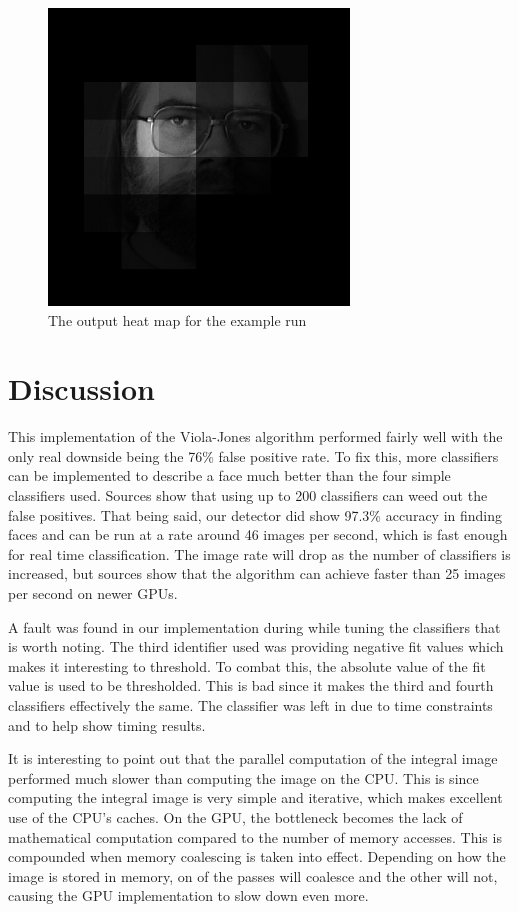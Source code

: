 \documentclass[12pt] {article}
\begin{document}
\begin{figure}[h!]
	\centering
		\includegraphics[width=80mm]{heatmap.png}
		\caption{The output heat map for the example run}
\end{figure}


\section{Discussion}
This implementation of the Viola-Jones algorithm performed fairly well with the only real downside being the 76\% false positive rate. To fix this, more classifiers can be implemented to describe a face much better than the four simple classifiers used. Sources show that using up to 200 classifiers can weed out the false positives. That being said, our detector did show 97.3\% accuracy in finding faces and can be run at a rate around 46 images per second, which is fast enough for real time classification. The image rate will drop as the number of classifiers is increased, but sources show that the algorithm can achieve faster than 25 images per second on newer GPUs.

A fault was found in our implementation during while tuning the classifiers that is worth noting. The third identifier used was providing negative fit values which makes it interesting to threshold. To combat this, the absolute value of the fit value is used to be thresholded. This is bad since it makes the third and fourth classifiers effectively the same. The classifier was left in due to time constraints and to help show timing results. 

It is interesting to point out that the parallel computation of the integral image performed much slower than computing the image on the CPU. This is since computing the integral image is very simple and iterative, which makes excellent use of the CPU's caches. On the GPU, the bottleneck becomes the lack of mathematical computation compared to the number of memory accesses. This is compounded when memory coalescing is taken into effect. Depending on how the image is stored in memory, on of the passes will coalesce and the other will not, causing the GPU implementation to slow down even more.
\end{document}
